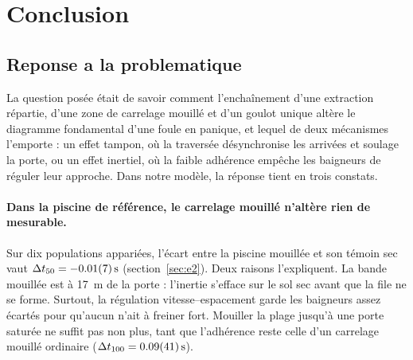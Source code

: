 \section{Conclusion}
\label{sec:conclusion}

\subsection{Reponse a la problematique}

La question posée était de savoir comment l'enchaînement d'une extraction répartie, d'une
zone de carrelage mouillé et d'un goulot unique altère le diagramme fondamental d'une foule
en panique, et lequel de deux mécanismes l'emporte : un effet tampon, où la traversée
désynchronise les arrivées et soulage la porte, ou un effet inertiel, où la faible adhérence
empêche les baigneurs de réguler leur approche. Dans notre modèle, la réponse tient en
trois constats.

\paragraph{Dans la piscine de référence, le carrelage mouillé n'altère rien de mesurable.}
Sur dix populations appariées, l'écart entre la piscine mouillée et son témoin sec vaut
$\Delta t_{50}=\SI{-0.01 \pm 0.07}{\second}$ (section~\ref{sec:e2}). Deux raisons
l'expliquent. La bande mouillée est à \SI{17}{\metre} de la porte : l'inertie s'efface sur le
sol sec avant que la file ne se forme. Surtout, la régulation vitesse--espacement garde les
baigneurs assez écartés pour qu'aucun n'ait à freiner fort. Mouiller la plage jusqu'à une
porte saturée ne suffit pas non plus, tant que l'adhérence reste celle d'un carrelage
mouillé ordinaire ($\Delta t_{100}=\SI{0.09 \pm 0.41}{\second}$).

